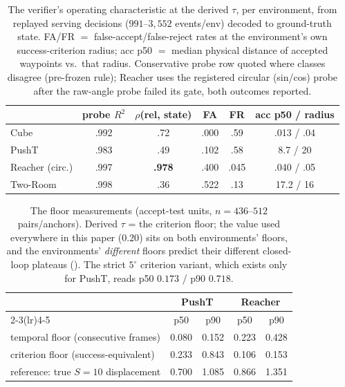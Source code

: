 \documentclass{article}
\newcommand{\degc}[1]{$#1^\circ$}
\begin{document}
\begin{table}[h]
\centering
\small
\caption{The verifier's operating characteristic at the derived $\tau$, per
environment, from replayed serving decisions ($991$--$3{,}552$ events/env) decoded
to ground-truth state. FA/FR $=$ false-accept/false-reject rates at the
environment's own success-criterion radius; acc p50 $=$ median physical distance of
accepted waypoints vs.\ that radius. Conservative probe row quoted where classes
disagree (pre-frozen rule); Reacher uses the registered circular (sin/cos) probe
after the raw-angle probe failed its gate, both outcomes reported.}
\label{tab:calibration}
\begin{tabular}{lccccc}
\toprule
& probe $R^{2}$ & $\rho$(rel, state) & FA & FR & acc p50 / radius \\
\midrule
Cube & .992 & .72 & .000 & .59 & .013 / .04 \\
PushT & .983 & .49 & .102 & .58 & 8.7 / 20 \\
Reacher (circ.) & .997 & \textbf{.978} & .400 & .045 & .040 / .05 \\
Two-Room & .998 & .36 & .522 & .13 & 17.2 / 16 \\
\bottomrule
\end{tabular}
\end{table}

\begin{table}[h]
\centering
\small
\caption{The floor measurements (accept-test units, $n{=}436$--$512$ pairs/anchors).
Derived $\tau$ = the criterion floor; the value used everywhere in this paper
($0.20$) sits on both environments' floors, and the environments' \emph{different}
floors predict their different closed-loop plateaus (). The
strict \degc{5} criterion variant, which exists only for PushT, reads p50
$0.173$ / p90 $0.718$.}
\label{tab:floor}
\begin{tabular}{lcccc}
\toprule
& \multicolumn{2}{c}{PushT} & \multicolumn{2}{c}{Reacher} \\
\cmidrule(lr){2-3}\cmidrule(lr){4-5}
& p50 & p90 & p50 & p90 \\
\midrule
temporal floor (consecutive frames)     & 0.080 & 0.152 & 0.223 & 0.428 \\
criterion floor (success-equivalent)    & 0.233 & 0.843 & 0.106 & 0.153 \\
\midrule
reference: true $S{=}10$ displacement   & 0.700 & 1.085 & 0.866 & 1.351 \\
\bottomrule
\end{tabular}
\end{table}
\end{document}
